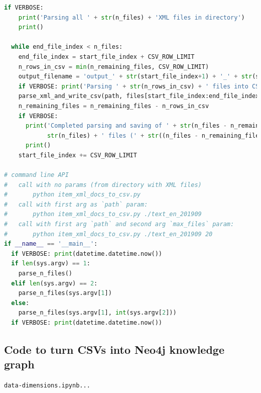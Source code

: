 \documentclass[11pt]{article}
\begin{document}
\begin{lstlisting}[language=Python]
  if VERBOSE:
    print('Parsing all ' + str(n_files) + 'XML files in directory')
    print()

  while end_file_index < n_files:
    end_file_index = start_file_index + CSV_ROW_LIMIT
    n_rows_in_csv = min(n_remaining_files, CSV_ROW_LIMIT)
    output_filename = 'output_' + str(start_file_index+1) + '_' + str(start_file_index + n_rows_in_csv) + '.csv'
    if VERBOSE: print('Parsing ' + str(n_rows_in_csv) + ' files into CSV rows in: ' + output_filename)
    parse_xml_and_write_csv(path, files[start_file_index:end_file_index], output_filename)
    n_remaining_files = n_remaining_files - n_rows_in_csv
    if VERBOSE:
      print('Completed parsing and saving of ' + str(n_files - n_remaining_files) + '/' + \
            str(n_files) + ' files (' + str((n_files - n_remaining_files) / n_files * 100) + '%)')
      print()
    start_file_index += CSV_ROW_LIMIT

# command line API
#   call with no params (from directory with XML files)
#       python item_xml_docs_to_csv.py
#   call with first arg as `path` param:
#       python item_xml_docs_to_csv.py ./text_en_201909
#   call with first arg `path` and second arg `max_files` param:
#       python item_xml_docs_to_csv.py ./text_en_201909 20
if __name__ == '__main__':
  if VERBOSE: print(datetime.datetime.now())
  if len(sys.argv) == 1:
    parse_n_files()
  elif len(sys.argv) == 2:
    parse_n_files(sys.argv[1])
  else:
    parse_n_files(sys.argv[1], int(sys.argv[2]))
  if VERBOSE: print(datetime.datetime.now())

\end{lstlisting}
\newpage

\subsection{Code to turn CSVs into Neo4j knowledge graph}
\label{sec:AppendixB}

\begin{lstlisting}
data-dimensions.ipynb...

\end{lstlisting}
\newpage
\end{document}
